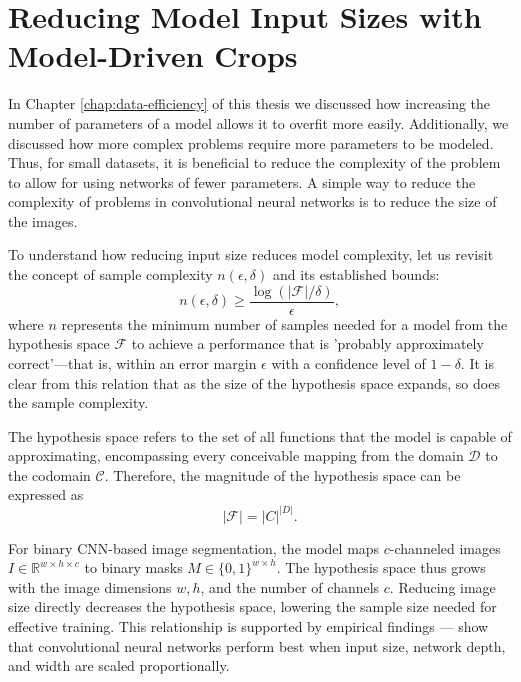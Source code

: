 
\chapter{Reducing Model Input Sizes with Model-Driven Crops}
\label{chap:reducing-input-size}

In Chapter \ref{chap:data-efficiency} of this thesis we discussed how increasing the number of parameters of a model allows it to overfit more easily. Additionally, we discussed how more complex problems require more parameters to be modeled. Thus, for small datasets, it is beneficial to reduce the complexity of the problem to allow for using networks of fewer parameters. A simple way to reduce the complexity of problems in convolutional neural networks is to reduce the size of the images.

To understand how reducing input size reduces model complexity, let us revisit the concept of sample complexity \(n(\epsilon, \delta)\) and its established bounds:
\begin{equation}
	n(\epsilon, \delta) \geq \frac{\log(\lvert \mathcal{F} \rvert / \delta)}{\epsilon},
\end{equation}
where \(n\) represents the minimum number of samples needed for a model from the hypothesis space \(\mathcal{F}\) to achieve a performance that is 'probably approximately correct'—that is, within an error margin \(\epsilon\) with a confidence level of \(1 - \delta\). It is clear from this relation that as the size of the hypothesis space expands, so does the sample complexity.

The hypothesis space refers to the set of all functions that the model is capable of approximating, encompassing every conceivable mapping from the domain \(\mathcal{D}\) to the codomain \(\mathcal{C}\). Therefore, the magnitude of the hypothesis space can be expressed as
\begin{equation}
	\lvert \mathcal{F} \rvert = {\lvert C \rvert}^{\lvert D \rvert}.
\end{equation}

For binary CNN-based image segmentation, the model maps \(c\)-channeled images \(I \in \mathbb{R}^{w \times h \times c}\) to binary masks \(M \in \{0, 1\}^{w \times h}\). The hypothesis space thus grows with the image dimensions \(w, h\), and the number of channels \(c\). Reducing image size directly decreases the hypothesis space, lowering the sample size needed for effective training. This relationship is supported by empirical findings --- \citet{tanEfficientNetRethinkingModel2020} show that convolutional neural networks perform best when input size, network depth, and width are scaled proportionally.

